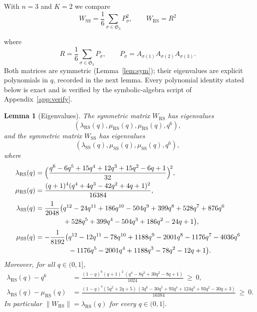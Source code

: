 \documentclass[11pt]{article}
\newtheorem{lemma}[theorem]{Lemma}
\theoremstyle{definition}
\theoremstyle{remark}
\newcommand{\norm}[1]{\left\lVert #1 \right\rVert}
\newcommand{\Wss}{W_{\mathrm{SS}}}
\newcommand{\Wrs}{W_{\mathrm{RS}}}
\begin{document}
With $n=3$ and $K=2$ we compare
\[
\Wss=\frac16\sum_{\sigma\in\mathfrak S_3}P_\sigma^2,
\qquad
\Wrs=R^2
\]

where
\[
R=\frac16\sum_{\sigma\in\mathfrak S_3}P_\sigma,
\qquad
P_\sigma=A_{\sigma(1)}A_{\sigma(2)}A_{\sigma(3)} .
\]
Both matrices are symmetric (Lemma~\ref{lem:sym}); their eigenvalues are explicit polynomials in $q$,
recorded in the next lemma. Every polynomial identity stated below is exact and is verified by the
symbolic-algebra script of Appendix~\ref{app:verify}.

\begin{lemma}[Eigenvalues]\label{lem:eig}
The symmetric matrix $\Wrs$ has eigenvalues
\[
(\lambda_{\mathrm{RS}}(q), \mu_{\mathrm{RS}}(q), \mu_{\mathrm{RS}}(q), q^6),
\]
and the symmetric matrix $\Wss$ has eigenvalues 
\[
(\lambda_{\mathrm{SS}}(q),  
\mu_{\mathrm{SS}}(q), \mu_{\mathrm{SS}}(q),  q^6),
\]
where
\begin{align*}
\lambda_{\mathrm{RS}}(q)&= \Bigl(\frac{q^6-6q^5+15q^4+12q^3+15q^2-6q+1}{32}\Bigr)^{\!2},\\
\mu_{\mathrm{RS}}(q)&=\frac{(q+1)^4(q^4+4q^3-42q^2+4q+1)^2}{16384},\\[2pt]
\lambda_{\mathrm{SS}}(q)&=\frac{1}{2048}\bigl(q^{12}-24q^{11}+186q^{10}-504q^9+399q^8+528q^7+876q^6\\
&\hphantom{{}=\frac{1}{2048}\bigl(}{}+528q^5+399q^4-504q^3+186q^2-24q+1\bigr),\\[2pt]
\mu_{\mathrm{SS}}(q)&=-\frac1{8192}\bigl(q^{12}-12q^{11}-78q^{10}+1188q^9-2001q^8-1176q^7-4036q^6\\
&\hphantom{{}=-\frac1{8192}\bigl(}{}-1176q^5-2001q^4+1188q^3-78q^2-12q+1\bigr).
\end{align*}
Moreover, for all $q\in(0,1]$,
\begin{align}
\lambda_{\mathrm{RS}}(q)-q^6 &= \frac{(1-q)^6(q+1)^2\,(q^4-8q^3+30q^2-8q+1)}{1024}\ \ge\ 0,
\label{eq:rsdom1}\\
\lambda_{\mathrm{RS}}(q)-\mu_{\mathrm{RS}}(q)
&= \frac{(1-q)^4(5q^2+2q+5)\,(3q^6-30q^5+93q^4+124q^3+93q^2-30q+3)}{16384}\ \ge\ 0.
\label{eq:rsdom2}
\end{align}
In particular $\norm{\Wrs}=\lambda_{\mathrm{RS}}(q)$ for every $q\in(0,1]$.
\end{lemma}
\end{document}
